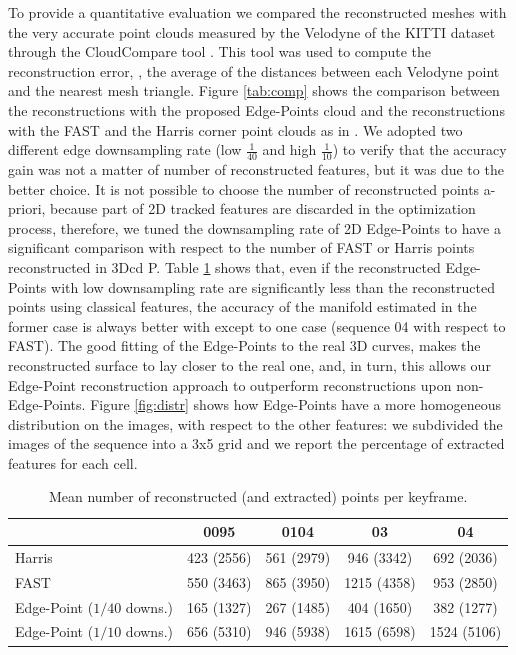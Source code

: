 To provide a quantitative evaluation we compared the reconstructed meshes with the very accurate point clouds measured by the Velodyne of the KITTI dataset through the CloudCompare tool \cite{cloudcompare}.
This tool was used to compute the reconstruction error, \ie, the average of the distances between each Velodyne point and the nearest mesh triangle.
Figure \ref{tab:comp} shows the comparison between the reconstructions with the proposed Edge-Points cloud and the reconstructions with the FAST and the Harris corner point clouds as in \cite{litvinov_Lhiuller14}.  
We adopted two different edge downsampling rate (low $\frac{1}{40}$ and high $\frac{1}{10}$) to verify that the accuracy gain was not a matter of number of reconstructed features, but it was due to the better choice. 
It is not possible to choose the number of reconstructed points a-priori, because part of 2D tracked features are discarded in the optimization process, therefore, we tuned the downsampling rate of 2D Edge-Points to have a significant comparison with respect to  the number of FAST or Harris points reconstructed in 3Dcd P.
Table \ref{tab:reconstrPt} shows that, even if the reconstructed Edge-Points with low downsampling rate are significantly less than the reconstructed points using classical features, the accuracy of the manifold estimated in the former case is always better with except to one case (sequence 04 with respect to FAST).  
The good fitting of the Edge-Points to the real 3D curves, makes the reconstructed surface to lay closer to the real one, and, in turn, this allows our Edge-Point reconstruction approach to outperform reconstructions upon non-Edge-Points.
Figure \ref{fig:distr} shows how Edge-Points have a more homogeneous distribution on the images, with respect to the other features: we subdivided the images of the sequence into a 3x5 grid and we report the percentage of extracted features for each cell.


\begin{table}[t]
  \caption{Mean number of reconstructed (and extracted) points per keyframe.}
    \label{tab:reconstrPt}
   \centering
   \begin{tabular}{p{}cccc}
   \toprule 
                                              & 0095            & 0104        &  03         & 04   \\
   \hline   
   {Harris}                                   & 423 (2556)      & 561 (2979)  & 946 (3342)  & 692 (2036) \\
   {FAST}                                     & 550 (3463)      & 865 (3950)  & 1215 (4358) & 953 (2850) \\
  {Edge-Point (${1}/{40}$ downs.)}   & 165 (1327)      & 267 (1485)  & 404 (1650)  & 382 (1277) \\
   {Edge-Point (${1}/{10}$ downs.)}  & 656 (5310)      & 946 (5938)  & 1615 (6598) & 1524 (5106)  \\
    \bottomrule
  \end{tabular}
  \end{table} 

